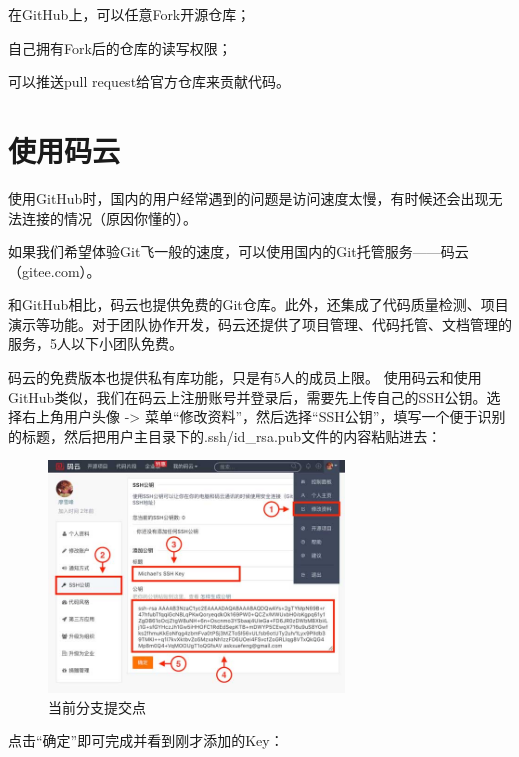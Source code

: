 \begin{tcolorbox}

在GitHub上，可以任意Fork开源仓库；

自己拥有Fork后的仓库的读写权限；

可以推送pull request给官方仓库来贡献代码。
\end{tcolorbox}

\chapter{使用码云}

使用GitHub时，国内的用户经常遇到的问题是访问速度太慢，有时候还会出现无法连接的情况（原因你懂的）。

如果我们希望体验Git飞一般的速度，可以使用国内的Git托管服务——码云（gitee.com）。

和GitHub相比，码云也提供免费的Git仓库。此外，还集成了代码质量检测、项目演示等功能。对于团队协作开发，码云还提供了项目管理、代码托管、文档管理的服务，5人以下小团队免费。

 码云的免费版本也提供私有库功能，只是有5人的成员上限。
使用码云和使用GitHub类似，我们在码云上注册账号并登录后，需要先上传自己的SSH公钥。选择右上角用户头像 -> 菜单“修改资料”，然后选择“SSH公钥”，填写一个便于识别的标题，然后把用户主目录下的.ssh/id\_rsa.pub文件的内容粘贴进去：

\begin{figure}[h]
  \centering
  \includegraphics[width=0.7\textwidth]{img/gitee-add-ssh-key.jpg}
  \caption{当前分支提交点}
  \label{fig:gitee-add-ssh-key}
\end{figure}

点击“确定”即可完成并看到刚才添加的Key：

